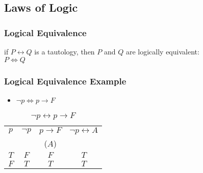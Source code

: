 \documentclass[dvipsnames]{beamer}
\begin{document}
\subsection{Laws of Logic}

\begin{frame}
  \frametitle{Logical Equivalence}

  \begin{definition}
    if $P \leftrightarrow Q$ is a tautology, then $P$ and $Q$ are
    \alert{logically equivalent}:\\
    $P \Leftrightarrow Q$
  \end{definition}
\end{frame}

\begin{frame}
  \frametitle{Logical Equivalence Example}

  \begin{example}
    \begin{itemize}
      \item $\neg p \Leftrightarrow p \rightarrow F$
    \end{itemize}

    \begin{table}
      \caption{$\neg p \leftrightarrow p \rightarrow F$}
      \begin{tabular}{|c|c|c||c|}\hline
        $p$ & $\neg p$ & $p \rightarrow F$ & $\neg p \leftrightarrow A$\\
            &          & ($A$)             &\\\hline\hline
        $T$ & $F$ & $F$ & $T$\\\hline
        $F$ & $T$ & $T$ & $T$\\\hline
      \end{tabular}
    \end{table}
  \end{example}
\end{frame}
\end{document}

